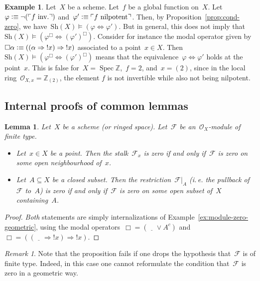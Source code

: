 \documentclass[10pt]{amsart}
\makeatletter
\theoremstyle{definition}
\newtheorem{ex}[defn]{Example}
\theoremstyle{plain}
\newtheorem{lemma}[defn]{Lemma}
\theoremstyle{remark}
\newtheorem{rem}[defn]{Remark}
\newcommand{\ZZ}{\mathbb{Z}}
\newcommand{\F}{\mathcal{F}}
\renewcommand{\O}{\mathcal{O}}
\newcommand{\placeholder}{\underline{\quad}}
\newcommand{\Sh}{\mathrm{Sh}}
\DeclareMathOperator{\Spec}{Spec}
\newcommand{\?}{\,{:}\,}
\renewcommand{\_}{\mathpunct{.}\,}
\newcommand{\speak}[1]{\ulcorner\text{\textnormal{#1}}\urcorner}
\newcommand{\notat}[1]{{!#1}}
\newcommand{\ie}{i.\,e.\@\xspace}
\newcommand{\inv}{inv.\@}
\newcommand{\defequiv}{\vcentcolon\equiv}
\makeatother
\begin{document}
\begin{ex}\label{ex:translation-equivalence}Let~$X$ be a scheme. Let~$f$ be a
global function on~$X$. Let~$\varphi \defequiv \neg(\speak{$f$ \inv})$
and~$\varphi' \defequiv \speak{$f$ nilpotent}$. Then, by Proposition~\ref{prop:cond-zero}, we
have~$\Sh(X) \models (\varphi \Leftrightarrow \varphi')$. But in general, this
does not imply that~$\Sh(X) \models (\varphi^\Box \Leftrightarrow
(\varphi')^\Box)$. Consider for instance the modal operator given by~$\Box\alpha
\defequiv ((\alpha \Rightarrow \notat{x}) \Rightarrow \notat{x})$ associated to a
point~$x \in X$. Then~$\Sh(X) \models (\varphi^\Box \Leftrightarrow
(\varphi')^\Box)$ means that the equivalence~$\varphi \Leftrightarrow \varphi'$
holds at the point~$x$. This is false for~$X = \Spec \ZZ$,~$f = 2$, and~$x =
(2)$, since in the local ring~$\O_{X,x} = \ZZ_{(2)}$, the element $f$ is not invertible
while also not being nilpotent.
\end{ex}


\subsection{Internal proofs of common lemmas}

\begin{lemma}\label{lemma:module-zero-point-neighbourhood}
Let~$X$ be a scheme (or ringed space). Let~$\F$ be an~$\O_X$-module
of finite type.
\begin{itemize}
\item Let~$x \in X$ be a point. Then the stalk~$\F_x$ is zero if and
only if~$\F$ is zero on some open neighbourhood of~$x$.
\item Let~$A \subseteq X$ be a closed subset. Then the restriction~$\F|_A$ (\ie
the pullback of~$\F$ to~$A$) is zero if and only if~$\F$ is zero on some open
subset of~$X$ containing~$A$.
\end{itemize}
\end{lemma}
\begin{proof}\emph{Both} statements are simply internalizations of
Example~\ref{ex:module-zero-geometric}, using the modal operators~$\Box =
(\placeholder \vee A^c)$ and~$\Box = ((\placeholder \Rightarrow
\notat{x}) \Rightarrow \notat{x})$.
\end{proof}

\begin{rem}Note that the proposition fails if one drops the hypothesis
that~$\F$ is of finite type. Indeed, in this case one cannot reformulate the
condition that~$\F$ is zero in a geometric way.\end{rem}
\end{document}

